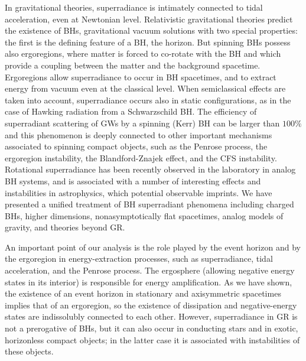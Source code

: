 \documentclass[11pt]{article}
\numberwithin{equation}{section} %
\begin{document}
In gravitational theories, superradiance is intimately connected to tidal acceleration, 
even at Newtonian level. Relativistic gravitational theories predict the existence of BHs, gravitational vacuum 
solutions with two special properties: the first is the defining feature of a BH, the horizon. But spinning BHs possess 
also ergoregions, where matter is forced to co-rotate with the BH and which provide a coupling between the matter and 
the background spacetime. Ergoregions allow superradiance to occur in BH 
spacetimes, and to extract energy from vacuum even at the classical level. 
When semiclassical effects are taken into 
account, superradiance occurs also in static configurations, as in the case of Hawking radiation from a Schwarzschild 
BH. The efficiency of superradiant scattering of GWs by a spinning (Kerr) BH can be larger than $100\%$ and this 
phenomenon is deeply connected to other important mechanisms associated to spinning compact objects, such as the Penrose 
process, the ergoregion instability, the Blandford-Znajek effect, and the CFS instability. 
%
Rotational superradiance has been recently observed in the laboratory in analog BH systems, and is associated with a number of interesting effects and instabilities
in astrophysics, which potential observable imprints. We have presented a unified treatment of BH superradiant phenomena including charged 
BHs, higher dimensions, nonasymptotically flat spacetimes, analog models of gravity, and theories beyond GR.

An important point of our analysis is the role played by the event horizon and by the ergoregion in energy-extraction 
processes, such as superradiance, tidal acceleration, and the Penrose process. 
The ergosphere (allowing negative energy states in its interior) is responsible for energy 
amplification. As we have shown, the existence of 
an event horizon in stationary and axisymmetric spacetimes implies that of an ergoregion, so the existence 
of dissipation and negative-energy states are indissolubly connected to each other.
%
However, superradiance in GR is not a prerogative of BHs, but it can also occur in conducting stars and in exotic, 
horizonless compact objects; in the latter case it is associated with instabilities of these objects.
\end{document}
